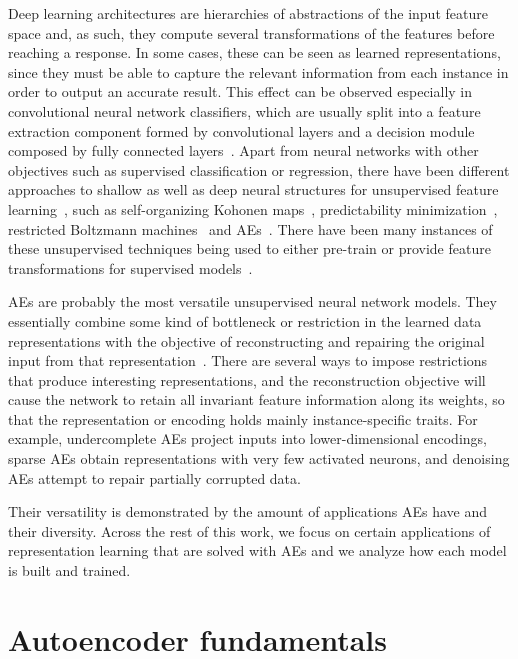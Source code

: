 \documentclass[
	fontsize=11pt, %
	twoside=false, %
	open=any, %
	secnumdepth=1, %
]{kaobook}
\begin{document}
Deep learning architectures are hierarchies of abstractions of the input feature space and, as such, they compute several transformations of the features before reaching a response. In some cases, these can be seen as learned representations, since they must be able to capture the relevant information from each instance in order to output an accurate result. This effect can be observed especially in convolutional neural network classifiers, which are usually split into a feature extraction component formed by convolutional layers and a decision module composed by fully connected layers~\cite{imagenet}. Apart from neural networks with other objectives such as supervised classification or regression, there have been different approaches to shallow as well as deep neural structures for unsupervised feature learning~\cite{reviewdl}, such as self-organizing Kohonen maps~\cite{kohonen1990self,koikkalainen1990self}, predictability minimization~\cite{schmidhuber1996semilinear}, restricted Boltzmann machines~\cite{DLBookRBM} and AEs~\cite{kramer1991nonlinear,oja1991}. There have been many instances of these unsupervised techniques being used to either pre-train or provide feature transformations for supervised models~\cite{bengio2012deep}.

AEs are probably the most versatile unsupervised neural network models. They essentially combine some kind of bottleneck or restriction in the learned data representations with the objective of reconstructing and repairing the original input from that representation~\cite{charte-tutorial}. There are several ways to impose restrictions that produce interesting representations, and the reconstruction objective will cause the network to retain all invariant feature information along its weights, so that the representation or encoding holds mainly instance-specific traits. For example, undercomplete AEs project inputs into lower-dimensional encodings, sparse AEs obtain representations with very few activated neurons, and denoising AEs attempt to repair partially corrupted data.

Their versatility is demonstrated by the amount of applications AEs have and their diversity. Across the rest of this work, we focus on certain applications of representation learning that are solved with AEs and we analyze how each model is built and trained. 


\section{Autoencoder fundamentals}\label{sec:ae}
\end{document}
